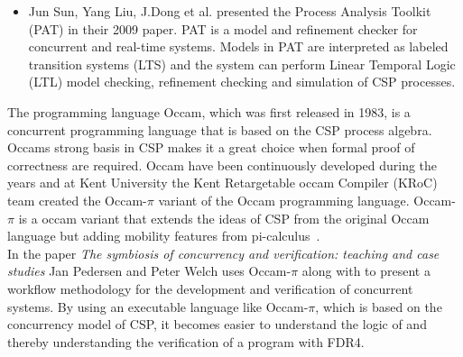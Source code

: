 \begin{itemize}
\item Jun Sun, Yang Liu, J.Dong et al. presented the Process Analysis Toolkit (PAT) in their 2009 paper\cite{Sun2009}. PAT is a model and refinement checker for concurrent and real-time systems. Models in PAT are interpreted as labeled transition systems (LTS) and the system can perform Linear Temporal Logic (LTL) model checking, refinement checking and simulation of CSP processes.
\end{itemize}
The programming language Occam\cite{Occam1995}, which was first released in 1983, is a concurrent programming language that is based on the CSP process algebra. Occams strong basis in CSP makes it a great choice when formal proof of correctness are required.
Occam have been continuously developed during the years and at Kent University the Kent Retargetable occam Compiler (KRoC) team created the Occam-$\pi$\cite{UniveristyofKent} variant of the Occam programming language.
Occam-$\pi$ is a occam variant that extends the ideas of CSP from the original Occam language but adding mobility features from pi-calculus~\cite{Milner1992}.
\\
In the paper \textit{The symbiosis of concurrency and verification: teaching and case studies}\cite{Pedersen2018} Jan Pedersen and Peter Welch uses Occam-$\pi$ along with \cspm{} to present a workflow methodology for the development and verification of concurrent systems. By using an executable language like Occam-$\pi$, which is based on the concurrency model of CSP, it becomes easier to understand the logic of \cspm{} and thereby understanding the verification of a program with FDR4.\\

